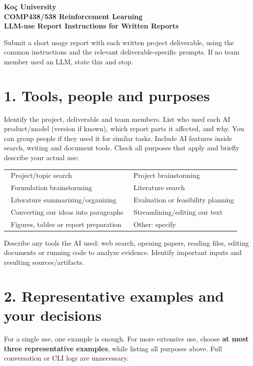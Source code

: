 \documentclass{article}
\newcommand{\cb}{\fbox{\rule{0pt}{0.7ex}\rule{0.7ex}{0pt}}\ }
\begin{document}
\begin{center}
{\Large\bfseries Ko\c{c} University\\COMP438/538 Reinforcement Learning\\LLM-use Report Instructions for Written Reports\par}
\end{center}

Submit a short usage report with each written project deliverable, using the common instructions and the relevant deliverable-specific prompts. If no team member used an LLM, state this and stop.

\section*{1. Tools, people and purposes}
Identify the project, deliverable and team members. List who used each AI product/model (version if known), which report parts it affected, and why. You can group people if they used it for similar tasks. Include AI features inside search, writing and document tools. Check all purposes that apply and briefly describe your actual use:
\begin{center}
\begin{tabularx}{\linewidth}{@{}LL@{}}
\cb Project/topic search & \cb Project brainstorming\\
\cb Formulation brainstorming & \cb Literature search\\
\cb Literature summarizing/organizing & \cb Evaluation or feasibility planning\\
\cb Converting our ideas into paragraphs & \cb Streamlining/editing our text\\
\cb Figures, tables or report preparation & \cb Other: specify\\
\end{tabularx}
\end{center}
Describe any tools the AI used: web search, opening papers, reading files, editing documents or running code to analyze evidence. Identify important inputs and resulting sources/artifacts. %

\section*{2. Representative examples and your decisions}
For a single use, one example is enough. For more extensive use, choose \textbf{at most three representative examples}, while listing all purposes above. Full conversation or CLI logs are unnecessary.
\end{document}
